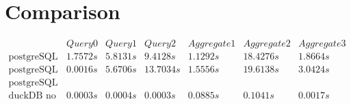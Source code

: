 \section{Comparison}\label{sec:comparison}

$\begin{matrix}
                                             & Query 0 & Query 1 & Query 2  & Aggregate 1 & Aggregate 2 & Aggregate 3 \\
        \hline
        \text{postgreSQL no opti}            & 1.7572s & 5.8131s & 9.4128s  & 1.1292s     & 18.4276s    & 1.8664s     \\
        \text{postgreSQL index on medallion} & 0.0016s & 5.6706s & 13.7034s & 1.5556s     & 19.6138s    & 3.0424s     \\
        \text{postgreSQL index + cluster}    &         &         &          &             &             &             \\
        \text{duckDB no opti}                & 0.0003s & 0.0004s & 0.0003s  & 0.0885s     & 0.1041s     & 0.0017s
    \end{matrix}$


